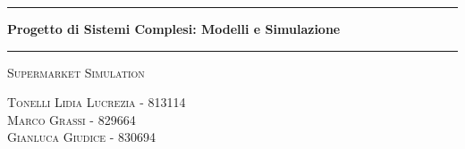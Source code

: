 \begin{titlepage}
	\begin{center}
		
		\vspace*{1.5cm}
		\hrule
		\vspace{0.5cm}
		\huge{\bfseries
			Progetto di Sistemi Complesi: Modelli e Simulazione
		}
		\vspace{0.5cm}
		\hrule
		
		\vspace{1.5cm}
		
		\textsc{\huge Supermarket Simulation}\\[1.5cm]
		
		\raggedleft
		\vspace*{\fill}
		\author{Tonelli Lidia Lucrezia (m. 813114) \\ Grassi Marco (m. 830694) \\ Giudice Gianluca (m. 829664)}
		{\Large\textsc{{Tonelli Lidia Lucrezia} - 813114}}\\
		{\Large\textsc{{Marco Grassi} - 829664}}\\
		{\Large\textsc{{Gianluca Giudice} - 830694}}\\
		
		\vspace*{3cm}
		
	\end{center}
\end{titlepage}